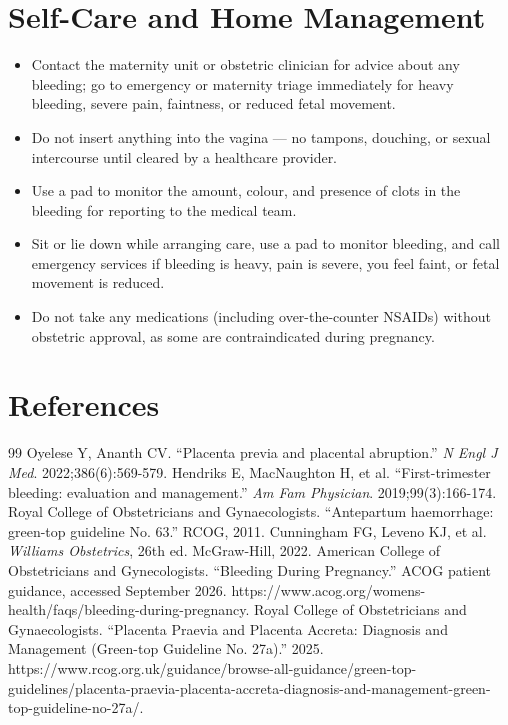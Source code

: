 \section*{Self-Care and Home Management}
\begin{itemize}
 \item Contact the maternity unit or obstetric clinician for advice about any bleeding; go to emergency or maternity triage immediately for heavy bleeding, severe pain, faintness, or reduced fetal movement.
 \item Do not insert anything into the vagina — no tampons, douching, or sexual intercourse until cleared by a healthcare provider.
 \item Use a pad to monitor the amount, colour, and presence of clots in the bleeding for reporting to the medical team.
 \item Sit or lie down while arranging care, use a pad to monitor bleeding, and call emergency services if bleeding is heavy, pain is severe, you feel faint, or fetal movement is reduced.
 \item Do not take any medications (including over-the-counter NSAIDs) without obstetric approval, as some are contraindicated during pregnancy.
\end{itemize}

\section*{References}
\begin{thebibliography}{99}
 Oyelese Y, Ananth CV. ``Placenta previa and placental abruption.'' \textit{N Engl J Med}. 2022;386(6):569-579.
 Hendriks E, MacNaughton H, et al. ``First-trimester bleeding: evaluation and management.'' \textit{Am Fam Physician}. 2019;99(3):166-174.
 Royal College of Obstetricians and Gynaecologists. ``Antepartum haemorrhage: green-top guideline No. 63.'' RCOG, 2011.
 Cunningham FG, Leveno KJ, et al. \textit{Williams Obstetrics}, 26th ed. McGraw-Hill, 2022.
 American College of Obstetricians and Gynecologists. ``Bleeding During Pregnancy.'' ACOG patient guidance, accessed September 2026. https://www.acog.org/womens-health/faqs/bleeding-during-pregnancy.
 Royal College of Obstetricians and Gynaecologists. ``Placenta Praevia and Placenta Accreta: Diagnosis and Management (Green-top Guideline No. 27a).'' 2025. https://www.rcog.org.uk/guidance/browse-all-guidance/green-top-guidelines/placenta-praevia-placenta-accreta-diagnosis-and-management-green-top-guideline-no-27a/.
\end{thebibliography}
